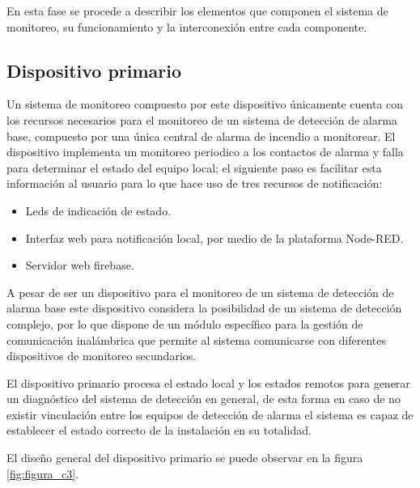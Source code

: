 En esta fase se procede a describir los elementos que componen el sistema de monitoreo, su funcionamiento y la interconexión entre cada componente.


\subsection{Dispositivo primario} 

Un sistema de monitoreo compuesto por este dispositivo únicamente cuenta con los recursos necesarios para el monitoreo de un sistema de detección de alarma base, compuesto por una única central de alarma de incendio a monitorear. El dispositivo implementa un monitoreo periodico a los contactos de alarma y falla para determinar el estado del equipo local; el siguiente paso es facilitar esta información al usuario  para lo que hace uso de tres recursos de notificación:
\begin{itemize}
\item Leds de indicación de estado.
\item Interfaz web para notificación local, por medio de la plataforma Node-RED.
\item Servidor web firebase.
\end{itemize}

A pesar de ser un dispositivo para el monitoreo de un sistema de detección de alarma base este dispositivo considera la posibilidad de un sistema de detección complejo, por lo que dispone de un módulo específico para la gestión de comunicación inalámbrica que permite al sistema comunicarse con diferentes dispositivos de monitoreo secundarios.

El dispositivo primario procesa el estado local y los estados remotos para generar un diagnóstico del sistema de detección en general, de esta forma en caso de no existir vinculación entre los equipos de detección de alarma el sistema es capaz de establecer el estado correcto de la instalación en su totalidad.

El diseño general del dispositivo primario se puede observar en la figura \ref{fig:figura_c3}.

